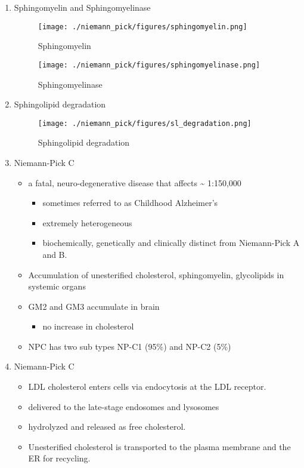 \documentclass{scrartcl}
\begin{document}
\begin{enumerate}
\item Sphingomyelin and Sphingomyelinase
\label{sec:org97e98f0}

\begin{figure}[htbp]
\centering
\texttt{[image: ./niemann\_pick/figures/sphingomyelin.png]}
\caption{\label{fig:org33f7488}
Sphingomyelin}
\end{figure}

\begin{figure}[htbp]
\centering
\texttt{[image: ./niemann\_pick/figures/sphingomyelinase.png]}
\caption{\label{fig:org1a8d058}
Sphingomyelinase}
\end{figure}


\item Sphingolipid degradation
\label{sec:org604907c}

\begin{figure}[htbp]
\centering
\texttt{[image: ./niemann\_pick/figures/sl\_degradation.png]}
\caption{\label{fig:orge9ab6c0}
Sphingolipid degradation}
\end{figure}

\item Niemann-Pick C
\label{sec:org0ca62f7}
\begin{itemize}
\item a fatal, neuro-degenerative disease that affects \textasciitilde{} 1:150,000
\begin{itemize}
\item sometimes referred to as Childhood Alzheimer’s
\item extremely heterogeneous
\item biochemically, genetically and clinically distinct from Niemann-Pick A and B.
\end{itemize}
\item Accumulation of unesterified cholesterol, sphingomyelin, glycolipids in systemic organs
\item GM2 and GM3 accumulate in brain
\begin{itemize}
\item no increase in cholesterol
\end{itemize}
\item NPC has two sub types NP-C1 (95\%) and NP-C2 (5\%)
\end{itemize}

\item Niemann-Pick C
\label{sec:org2470c75}

\begin{itemize}
\item LDL cholesterol enters cells via endocytosis at the LDL receptor.
\item delivered to the late-stage endosomes and lysosomes
\item hydrolyzed and released as free cholesterol.
\item Unesterified cholesterol is transported to the plasma membrane and the ER for recycling.


\end{itemize}
\end{enumerate}
\end{document}
